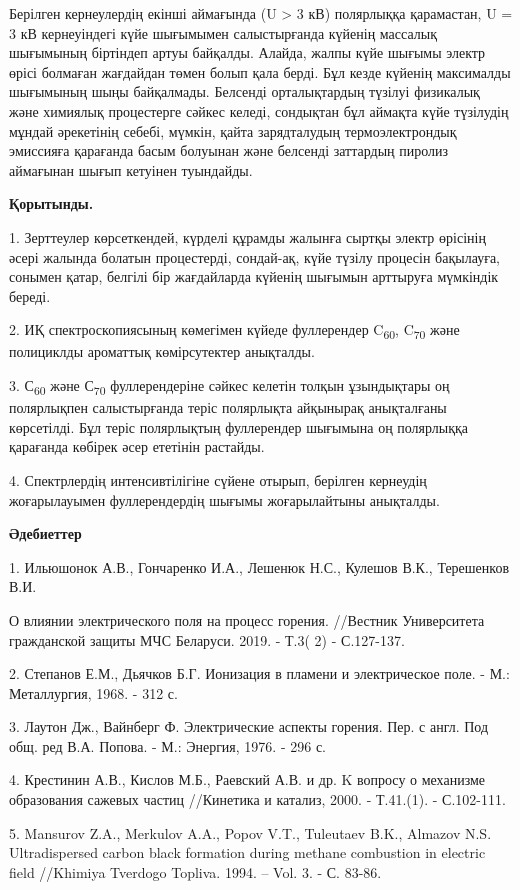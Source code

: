 Берілген кернеулердің екінші аймағында (U \textgreater{} 3 кВ)
полярлыққа қарамастан, U = 3 кВ кернеуіндегі күйе шығымымен
салыстырғанда күйенің массалық шығымының біртіндеп артуы байқалды.
Алайда, жалпы күйе шығымы электр өрісі болмаған жағдайдан төмен болып
қала берді. Бұл кезде күйенің максималды шығымының шыңы байқалмады.
Белсенді орталықтардың түзілуі физикалық және химиялық процестерге
сәйкес келеді, сондықтан бұл аймақта күйе түзілудің мұндай әрекетінің
себебі, мүмкін, қайта зарядталудың термоэлектрондық эмиссияға қарағанда
басым болуынан және белсенді заттардың пиролиз аймағынан шығып кетуінен
туындайды.

{\bfseries Қорытынды.}

1. Зерттеулер көрсеткендей, күрделі құрамды жалынға сыртқы электр
өрісінің әсері жалында болатын процестерді, сондай-ақ, күйе түзілу
процесін бақылауға, сонымен қатар, белгілі бір жағдайларда күйенің
шығымын арттыруға мүмкіндік береді.

2. ИҚ спектроскопиясының көмегімен күйеде фуллерендер
C\textsubscript{60}, C\textsubscript{70} және полициклды ароматтық
көмірсутектер анықталды.

3. С\textsubscript{60} және С\textsubscript{70} фуллерендеріне сәйкес
келетін толқын ұзындықтары оң полярлықпен салыстырғанда теріс полярлықта
айқынырақ анықталғаны көрсетілді. Бұл теріс полярлықтың фуллерендер
шығымына оң полярлыққа қарағанда көбірек әсер ететінін растайды.

4. Спектрлердің интенсивтілігіне сүйене отырып, берілген кернеудің
жоғарылауымен фуллерендердің шығымы жоғарылайтыны анықталды.

{\bfseries Әдебиеттер}

1. Ильюшонок А.В., Гончаренко И.А., Лешенюк Н.С., Кулешов В.К.,
Терешенков В.И.

О влиянии электрического поля на процесс горения. //Вестник Университета
гражданской защиты МЧС Беларуси. 2019. - Т.3( 2) - С.127-137.

2. Степанов Е.М., Дьячков Б.Г. Ионизация в пламени и электрическое поле.
- М.: Металлургия, 1968. - 312 с.

3. Лаутон Дж., Вайнберг Ф. Электрические аспекты горения. Пер. с англ.
Под общ. ред В.А. Попова. - М.: Энергия, 1976. - 296 с.

4. Крестинин А.В., Кислов М.Б., Раевский А.В. и др. K вопросу о
механизме образования сажевых частиц //Кинетика и катализ, 2000. -
Т.41.(1). - С.102-111.

5. Mansurov Z.A., Merkulov A.A., Popov V.T., Tuleutaev B.K., Almazov
N.S. Ultradispersed carbon black formation during methane combustion in
electric field //Khimiya Tverdogo Topliva. 1994. -- Vol. 3. - С. 83-86.


